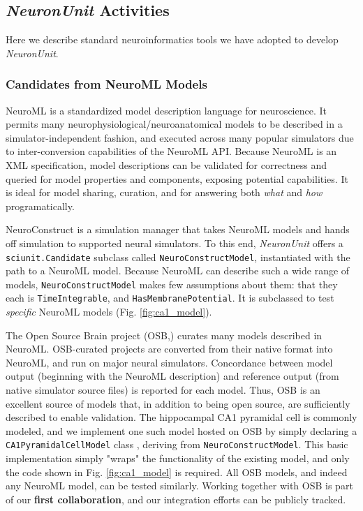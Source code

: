 \documentclass[11pt,letterpaper]{article}
\let\verbx\lstinline
\begin{document}
\subsection{\textit{NeuronUnit} Activities}
\label{sec:neuronunit_acitivities}
Here we describe standard neuroinformatics tools we have adopted to develop \textit{NeuronUnit}\cite{NeuronUnit_url}.  

\subsubsection{Candidates from NeuroML Models}\label{sec:neuroml_candidates}
NeuroML is a standardized model description language for neuroscience\cite{gleeson_neuroml:_2010}. It permits many neurophysiological/neuroanatomical models to be described in a simulator-independent fashion, and executed across many popular simulators due to inter-conversion capabilities of the NeuroML API.  Because NeuroML is an XML specification, model descriptions can be validated for correctness and queried for model properties and components, exposing potential capabilities.  It is ideal for model sharing, curation, and for answering both \textit{what} and \textit{how} programatically.  

NeuroConstruct\cite{neuroconstruct_url,gleeson_neuroconstruct:_2007} is a simulation manager that takes NeuroML models and hands off simulation to supported neural simulators. To this end, \textit{NeuronUnit} offers a \verbx{sciunit.Candidate} subclass called \verbx{NeuroConstructModel}, instantiated with the path to a NeuroML model.  Because NeuroML can describe such a wide range of models, \verbx{NeuroConstructModel} makes few assumptions about them: that they each is \verbx{TimeIntegrable}, and \verbx{HasMembranePotential}.  It is subclassed to test \textit{specific} NeuroML models (Fig. \ref{fig:ca1_model}). 

The Open Source Brain project (OSB,\cite{osb_url}) curates many models described in NeuroML. OSB-curated projects are converted from their native format into NeuroML, and run on major neural simulators\cite{neuron_url,genesis_url,nest_url,moose_url}. Concordance between model output (beginning with the NeuroML description) and reference output (from native simulator source files) is reported for each model.  Thus, OSB is an excellent source of models that, in addition to being open source, are sufficiently described to enable validation.   The hippocampal CA1 pyramidal cell is commonly modeled, and we implement one such model hosted on OSB\cite{osb_ca1_url} by simply declaring a \verbx{CA1PyramidalCellModel} class , deriving from \verbx{NeuroConstructModel}.  This basic implementation simply "wraps" the functionality of the existing model, and only the code shown in Fig. \ref{fig:ca1_model} is required.  All OSB models, and indeed any NeuroML model, can be tested similarly.  Working together with OSB is part of our \textbf{first collaboration}, and our integration efforts can be publicly tracked\cite{neuroconstruct_rgerkin_url}.  
\end{document}
